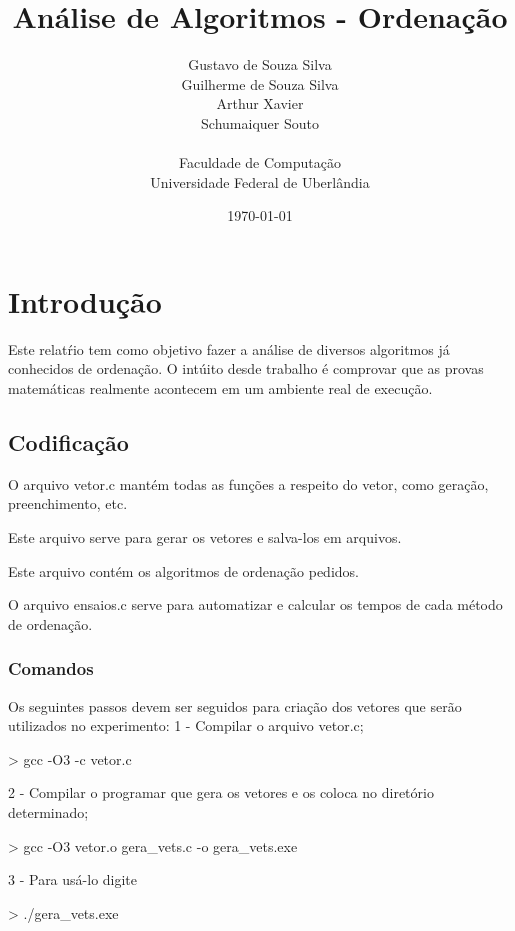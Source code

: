 \documentclass[12pt,a4paper,twoside]{report}
\title{Análise de Algoritmos - Ordenação}
\date{}
\author{Gustavo de Souza Silva \\ Guilherme de Souza Silva \\ Arthur Xavier \\ Schumaiquer Souto \\
\vspace{1cm} \\
Faculdade de Computação \\
Universidade Federal de Uberlândia
}
\date{\today}
\begin{document}
  \maketitle
\listoffigures            
\listoftables            
\lstlistoflistings

\tableofcontents    


\fancyhead[RE,LO]{\thesection}

\setlength{\parskip}{0.15in} %

\chapter{Introdução}
Este relatŕio tem como objetivo fazer a análise de diversos algoritmos já conhecidos de ordenação. O intúito desde trabalho é comprovar que as provas matemáticas realmente acontecem em um ambiente real de execução.

\section{Codificação}
O arquivo vetor.c mantém todas as funções a respeito do vetor, como geração, preenchimento, etc.


Este arquivo serve para gerar os vetores e salva-los em arquivos.


Este arquivo contém os algoritmos de ordenação pedidos.


O arquivo ensaios.c serve para automatizar e calcular os tempos de cada método de ordenação.


\subsection{Comandos}
Os seguintes passos devem ser seguidos para criação dos vetores que serão utilizados no experimento:
1 - Compilar o arquivo vetor.c;
\begin{terminal}
    > gcc -O3 -c vetor.c
\end{terminal}
2 - Compilar o programar que gera os vetores e os coloca no diretório determinado;
\begin{terminal}
    > gcc -O3 vetor.o gera_vets.c -o gera_vets.exe
\end{terminal}
3 - Para usá-lo digite
\begin{terminal}
    > ./gera_vets.exe
\end{terminal}
\end{document}
